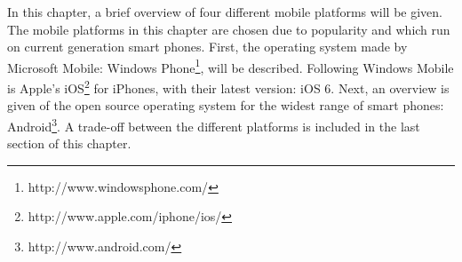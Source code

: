 In this chapter, a brief overview of four different mobile platforms will be given. The mobile platforms in this chapter are chosen due to popularity and which run on current generation smart phones. First, the operating system made by Microsoft Mobile: Windows Phone\footnote{http://www.windowsphone.com/}, will be described. Following Windows Mobile is Apple's iOS\footnote{http://www.apple.com/iphone/ios/} for iPhones, with their latest version: iOS 6. Next, an overview is given of the open source operating system for the widest range of smart phones: Android\footnote{http://www.android.com/}. A trade-off between the different platforms is included in the last section of this chapter.
